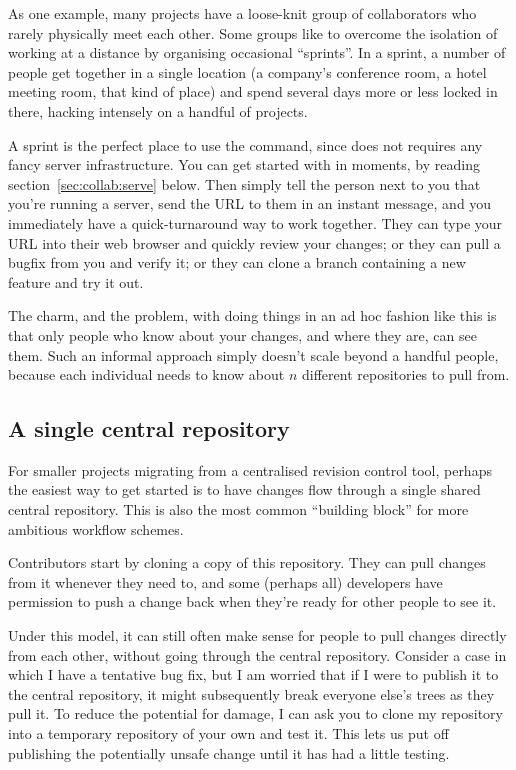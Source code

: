 As one example, many projects have a loose-knit group of collaborators
who rarely physically meet each other.  Some groups like to overcome
the isolation of working at a distance by organising occasional
``sprints''.  In a sprint, a number of people get together in a single
location (a company's conference room, a hotel meeting room, that kind
of place) and spend several days more or less locked in there, hacking
intensely on a handful of projects.

A sprint is the perfect place to use the  command, since
 does not requires any fancy server infrastructure.  You
can get started with  in moments, by reading
section~\ref{sec:collab:serve} below.  Then simply tell the person
next to you that you're running a server, send the URL to them in an
instant message, and you immediately have a quick-turnaround way to
work together.  They can type your URL into their web browser and
quickly review your changes; or they can pull a bugfix from you and
verify it; or they can clone a branch containing a new feature and try
it out.

The charm, and the problem, with doing things in an ad hoc fashion
like this is that only people who know about your changes, and where
they are, can see them.  Such an informal approach simply doesn't
scale beyond a handful people, because each individual needs to know
about $n$ different repositories to pull from.

\subsection{A single central repository}

For smaller projects migrating from a centralised revision control
tool, perhaps the easiest way to get started is to have changes flow
through a single shared central repository.  This is also the
most common ``building block'' for more ambitious workflow schemes.

Contributors start by cloning a copy of this repository.  They can
pull changes from it whenever they need to, and some (perhaps all)
developers have permission to push a change back when they're ready
for other people to see it.

Under this model, it can still often make sense for people to pull
changes directly from each other, without going through the central
repository.  Consider a case in which I have a tentative bug fix, but
I am worried that if I were to publish it to the central repository,
it might subsequently break everyone else's trees as they pull it.  To
reduce the potential for damage, I can ask you to clone my repository
into a temporary repository of your own and test it.  This lets us put
off publishing the potentially unsafe change until it has had a little
testing.

